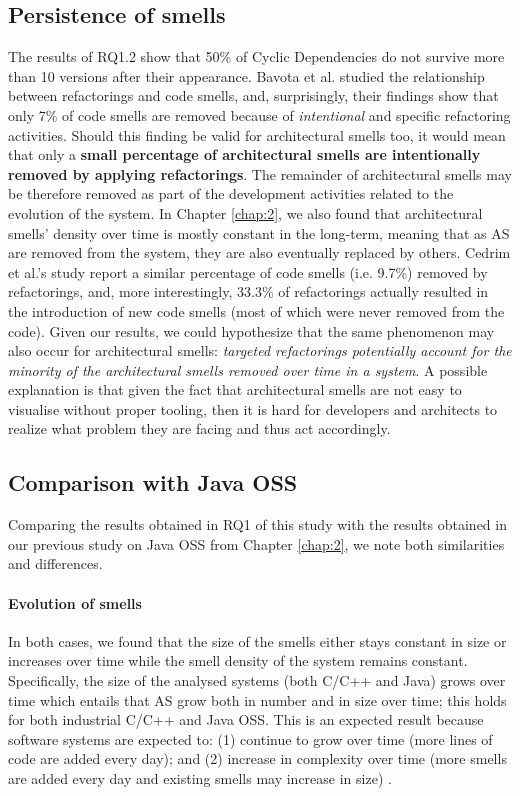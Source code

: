 \subsection{Persistence of smells}
The results of RQ1.2 show that 50\% of Cyclic Dependencies do not survive more than 10 versions after their appearance.
Bavota et al. \cite{Bavota2015} studied the relationship between refactorings and code smells, and, surprisingly, their findings show that only 7\% of code smells are removed because of \emph{intentional} and specific refactoring activities. 
Should this finding be valid for architectural smells too, it would mean that only a \textbf{small percentage of architectural smells are intentionally removed by applying refactorings}.
The remainder of architectural smells may be therefore removed as part of the development activities related to the evolution of the system.
In Chapter \ref{chap:2}, we also found that architectural smells' density over time is mostly constant in the long-term, meaning that as AS are removed from the system, they are also eventually replaced by others.
Cedrim et al.'s study \cite{Cedrim2017} report a similar percentage of code smells (i.e. 9.7\%) removed by refactorings, and, more interestingly, 33.3\% of refactorings actually resulted in the introduction of new code smells (most of which were never removed from the code).
Given our results, we could hypothesize that the same phenomenon may also occur for architectural smells: \emph{targeted refactorings potentially account for the minority of the architectural smells removed over time in a system}.
A possible explanation is that given the fact that architectural smells are not easy to visualise without proper tooling, then it is hard for developers and architects to realize what problem they are facing and thus act accordingly.

\subsection{Comparison with Java OSS}
Comparing the results obtained in RQ1 of this study with the results obtained in our previous study on Java OSS from Chapter \ref{chap:2}, we note both similarities and differences.

\paragraph{Evolution of smells}
In both cases, we found that the size of the smells either stays constant in size or increases over time while the smell density of the system remains constant.
Specifically, the size of the analysed systems (both C/C++ and Java) grows over time which entails that AS grow both in number and in size over time; this holds for both industrial C/C++ and Java OSS.
This is an expected result because software systems are expected to: (1) continue to grow over time (more lines of code are added every day); and (2) increase in complexity over time (more smells are added every day and existing smells may increase in size) \cite{Lehman1980}.

